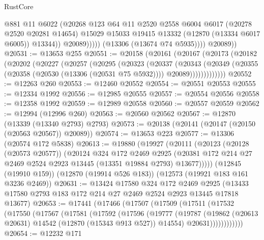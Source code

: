 \begin{lexlean}{RustCore}
\begin{coremodule}
                        @881
                        @11
                        @6022
                        (@20268
                          @123
                          @64
                          @11
                          @2520
                          @2558
                          @6004
                          @6017
                          (@20278 @2520 @20281 @14654)
                          @15029
                          @15033
                          @19415
                          @13332
                          (@12870 (@13334 @6017 @6005))
                          @13344))
                      @20089)))))
            (@13306 (@13674 @74 @5935))))
        @20089))
@20531 := @13653 @255
@20551 := @20158
    (@20161
      (@20167
        (@20173
          (@20182
            (@20202
              (@20227
                (@20257
                  (@20295
                    (@20323
                      (@20337
                        (@20343
                          (@20349
                            (@20355
                              (@20358 (@20530 (@13306 (@20531 @75 @5932))))
                              @20089)))))))))))))
@20552 := @12263 @260
@20553 := @12460 @20552
@20554 := @20551 @20553
@20555 := @12334 @1992
@20556 := @12985 @20555
@20557 := @20554 @20556
@20558 := @12358 @1992
@20559 := @12989 @20558
@20560 := @20557 @20559
@20562 := @12994 (@12996 @260)
@20563 := @20560 @20562
@20567 := @12870 (@13339 (@13340 @2793) @2793)
@20573 := @20138 (@20141 (@20147 (@20150 (@20563 @20567)) @20089))
@20574 := @13653 @223
@20577 := @13306 (@20574 @172 @5838)
@20613 := @19880
    (@19927
      (@20111
        (@20123
          (@20128 (@20573 @20577))
          (@20124
            @324
            @172
            @2469
            @2925
            (@20381 @172 @214 @27 @2469 @2524 @2923 @13445 (@13351 @19884 @2793) @13677)))))
    (@12845 (@19910 @159))
    (@12870 (@19914 @526 @183))
    (@12573 (@19921 @183 @161 @3236 @2469))
@20631 := @13424
    @17580
    @324
    @172
    @2469
    @2925
    (@13433 @17580 @2793 @183 @172 @214 @27 @2469 @2524 @2923 @13445 @17818 @13677)
@20653 := @17441
    (@17466
      (@17507
        (@17509
          (@17511
            (@17532
              (@17550
                (@17567
                  (@17581
                    (@17592
                      (@17596
                        (@19777
                          (@19787
                            (@19862 (@20613 @20631) @14542 (@12870 (@15343 @913 @527)) @14554)
                            @20631))))))))))))
@20654 := @12232 @171

\end{coremodule}
\end{lexlean}
